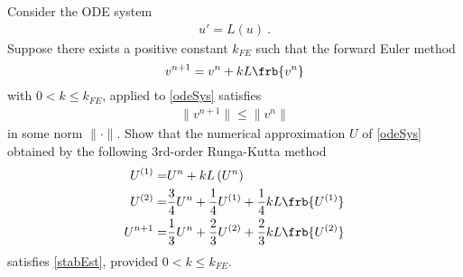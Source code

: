 \documentclass{article}
\begin{document}
\begin{exerciseList}
\item
Consider the ODE system
\begin{gather} \label{odeSys}
	u'=L(u)\ .
\end{gather}%
Suppose there exists a positive constant $k_{FE}$ such that the forward Euler method
$$
	v^{n+1}=v^n+kL\frb{v^n}
$$
with $0< k\le k_{FE}$, applied to \eqref{odeSys} satisfies
\begin{gather} \label{stabEst}
	\|v^{n+1}\|\le\|v^n\|
\end{gather}%
in some norm $\|\cdot\|$.
Show that the numerical approximation $U$ of \eqref{odeSys} obtained by the following 3rd-order Runga-Kutta method
\begin{align*}
	U^{\left(1\right)}= & U^{n}+kL\left(U^{n}\right)\\
	U^{\left(2\right)}= & \frac{3}{4}U^{n}+\frac{1}{4}U^{\left(1\right)}+\frac{1}{4}kL\frb{U^{\left(1\right)}}\\
	U^{n+1}= & \frac{1}{3}U^{n}+\frac{2}{3}U^{\left(2\right)}+\frac{2}{3}kL\frb{U^{\left(2\right)}}
\end{align*}
satisfies \eqref{stabEst}, provided $0< k\le k_{FE}$.


%
%
%



\end{exerciseList}
\end{document}
